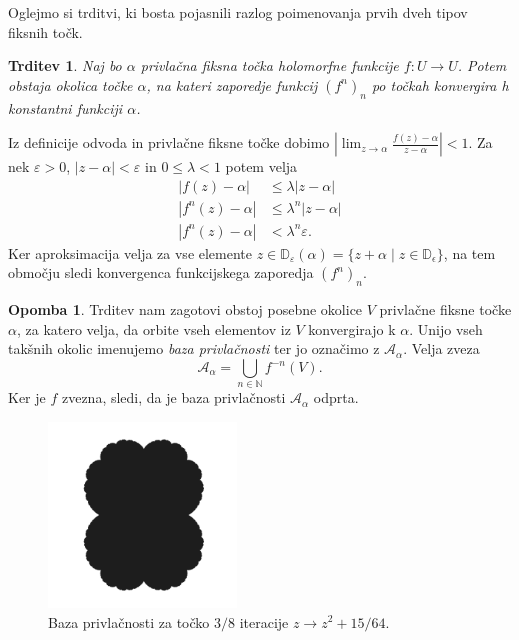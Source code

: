 \documentclass[12pt,a4paper]{amsart}
\theoremstyle{definition} %
\newtheorem{opomba}[definicija]{Opomba}
\theoremstyle{plain} %
\newtheorem{trditev}[definicija]{Trditev}
\newcommand{\N}{\mathbb N}
\newcommand{\D}{\mathbb D} %
\newcommand{\A}{\mathscr A} %
\begin{document}
Oglejmo si trditvi, ki bosta pojasnili razlog poimenovanja prvih dveh tipov fiksnih točk.

\begin{trditev}\label{trd:attractionBasin}
Naj bo  $\alpha$ privlačna fiksna točka holomorfne funkcije $f \colon U \to U$. 
Potem obstaja okolica točke $\alpha$, na kateri zaporedje funkcij $(f^n)_n$
po točkah konvergira h konstantni funkciji $\alpha$.
\end{trditev}

\proof
Iz definicije odvoda in privlačne fiksne točke dobimo $|\lim_{z \to \alpha} \frac{f(z) - \alpha}{z - \alpha}| < 1$.
Za nek $\varepsilon > 0$, $|z - \alpha| < \varepsilon$ in $0 \leq \lambda < 1$ potem velja
\begin{equation*}
\begin{aligned}
|f(z) - \alpha| & \leq \lambda |z  - \alpha| \\
|f^n(z) - \alpha| &\leq \lambda^n |z - \alpha| \\
|f^n(z) - \alpha| &< \lambda^n \varepsilon.
\end{aligned}
\end{equation*}
Ker aproksimacija velja za vse elemente $z \in \D_\varepsilon(\alpha) = \{z + \alpha \mid z \in \D_\epsilon\}$, 
na tem območju sledi konvergenca funkcijskega zaporedja $(f^n)_n$.
\endproof

\begin{opomba}\label{op:attBasinOpen}
Trditev nam zagotovi obstoj posebne okolice $V$ privlačne fiksne točke $\alpha$, 
za katero velja, da orbite vseh elementov iz $V$ konvergirajo k $\alpha$.
Unijo vseh takšnih okolic imenujemo {\em baza privlačnosti} ter jo označimo z $\A_\alpha$.
Velja zveza
$$\A_\alpha = \bigcup_{n\in\N} f^{-n}(V).$$
Ker je $f$ zvezna, sledi, da je baza privlačnosti $\A_\alpha$ odprta.
\end{opomba}

\begin{figure}[h]
\includegraphics[width=5cm]{graphics/attractionBasin.png}
\caption{Baza privlačnosti za točko $3/8$ iteracije $z \to z^2 + 15/64$.}
\end{figure}
\end{document}
